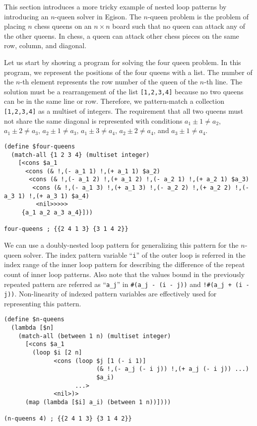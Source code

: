 \documentclass{article}
\begin{document}
This section introduces a more tricky example of nested loop patterns by introducing an $n$-queen solver in Egison.
The $n$-queen problem is the problem of placing $n$ chess queens on an $n \times n$ board such that no queen can attack any of the other queens.
In chess, a queen can attack other chess pieces on the same row, column, and diagonal.

Let us start by showing a program for solving the four queen problem.
In this program, we represent the positions of the four queens with a list.
The number of the $n$-th element represents the row number of the queen of the $n$-th line.
The solution must be a rearrangement of the list \verb|[1,2,3,4]| because no two queens can be in the same line or row.
Therefore, we pattern-match a collection \verb|[1,2,3,4]| as a multiset of integers.
The requirement that all two queens must not share the same diagonal is represented with conditions $a_1 \pm 1 \neq a_2$, $a_1 \pm 2 \neq a_3$, $a_2 \pm 1 \neq a_3$, $a_1 \pm 3 \neq a_4$, $a_2 \pm 2 \neq a_4$, and $a_3 \pm 1 \neq a_4$.

\begin{lstlisting}[language=egison]
(define $four-queens
  (match-all {1 2 3 4} (multiset integer)
    [<cons $a_1
      <cons (& !,(- a_1 1) !,(+ a_1 1) $a_2)
       <cons (& !,(- a_1 2) !,(+ a_1 2) !,(- a_2 1) !,(+ a_2 1) $a_3)
        <cons (& !,(- a_1 3) !,(+ a_1 3) !,(- a_2 2) !,(+ a_2 2) !,(- a_3 1) !,(+ a_3 1) $a_4)
         <nil>>>>>
     {a_1 a_2 a_3 a_4}]))

four-queens ; {{2 4 1 3} {3 1 4 2}}
\end{lstlisting}

We can use a doubly-nested loop pattern for generalizing this pattern for the $n$-queen solver.
The index pattern variable ``\verb|i|'' of the outer loop is referred in the index range of the inner loop pattern for describing the difference of the repeat count of inner loop patterns.
Also note that the values bound in the previously repeated pattern are referred as ``\verb|a_j|'' in \verb|#(a_j - (i - j))| and  \verb|!#(a_j + (i - j))|.
Non-linearity of indexed pattern variables are effectively used for representing this pattern.

\begin{lstlisting}[language=egison]
(define $n-queens
  (lambda [$n]
    (match-all (between 1 n) (multiset integer)
      [<cons $a_1
        (loop $i [2 n]
              <cons (loop $j [1 (- i 1)]
                          (& !,(- a_j (- i j)) !,(+ a_j (- i j)) ...)
                          $a_i)
                    ...>
              <nil>)>
      (map (lambda [$i] a_i) (between 1 n))])))

(n-queens 4) ; {{2 4 1 3} {3 1 4 2}}
\end{lstlisting}
\end{document}
